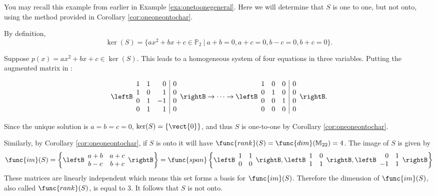\begin{solution}
You may recall this example from earlier in Example \ref{exa:onetoonegeneral}. Here we will determine that $S$ is one to one, but not onto, using the method provided in Corollary \ref{cor:oneoneontochar}.

By definition, 
\[ \ker(S)=\{ax^2+bx+c\in \mathbb{P}_2 ~|~ a+b=0,
a+c=0, b-c=0, b+c=0\}.\]

Suppose $p(x)=ax^2+bx+c\in\ker(S)$.
This leads to a homogeneous system of four equations in three 
variables.  
Putting the augmented matrix in {\rref}: 

\[ \leftB\begin{array}{rrr|c}
1 & 1 & 0 & 0  \\
1 & 0 & 1 & 0  \\
0 & 1 & -1 & 0  \\
0 & 1 & 1 & 0  \end{array}\rightB
\rightarrow \cdots \rightarrow
\leftB\begin{array}{ccc|c}
1 & 0 & 0 & 0  \\
0 & 1 & 0 & 0  \\
0 & 0 & 1 & 0  \\
0 & 0 & 0 & 0  \end{array}\rightB. \]

Since the unique solution is $a=b=c=0$, $\ker(S)=\{\vect{0}\}$, and thus
$S$ is one-to-one by Corollary \ref{cor:oneoneontochar}.

Similarly, by Corollary \ref{cor:oneoneontochar}, if $S$ is onto it will have $\func{rank}(S) = \func{dim}(\mathbb{M}_{22}) = 4$. The image of $S$ is given by 
\[
\func{im}(S) = \left\{ \leftB\begin{array}{cc}
a+b & a+c \\ b-c & b+c \end{array}\rightB \right\} = \func{span} \left\{ \leftB\begin{array}{rr}
1 & 1 \\
0 & 0 \end{array} \rightB, \leftB\begin{array}{rr}
1 & 0 \\
1 & 1 \end{array} \rightB, \leftB\begin{array}{rr}
0 & 1 \\
-1 & 1 \end{array} \rightB \right\}
\]
These matrices are linearly independent which means this set forms a basis for $\func{im}(S)$. Therefore the dimension of $\func{im}(S)$, also called $\func{rank}(S)$, is equal to $3$. It follows that $S$ is not onto. 
\end{solution}
